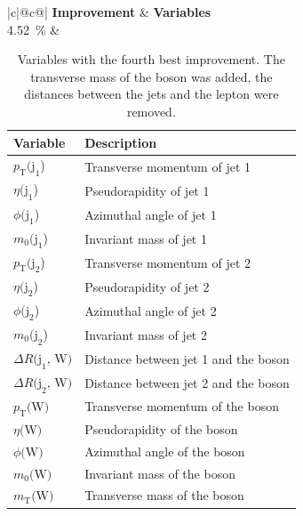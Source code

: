 \begin{table}[h]
    \centering
    \label{tab:app_vars_4}
    \caption{Variables with the fourth best improvement. The transverse mass of the \PW boson was added, the distances between the jets and the lepton were removed.}
    \begin{tabular}{ |c|@{}c@{}| }
        \hline
        \textbf{Improvement} & \textbf{Variables}\\
        \hline
        \SI{4.52}{\%} & 
        \begin{tabular}{ll}
            \hline
            Variable & Description\\
            \hline
            $p_\text{T}\text{(j}_\text{1}$) & Transverse momentum of jet 1\\
            $\eta\text{(j}_\text{1}$) & Pseudorapidity of jet 1\\
            $\phi\text{(j}_\text{1}$) & Azimuthal angle of jet 1\\
            $m_0\text{(j}_\text{1}$) & Invariant mass of jet 1\\

            $p_\text{T}\text{(j}_\text{2}$) & Transverse momentum of jet 2\\
            $\eta\text{(j}_\text{2}$) & Pseudorapidity of jet 2\\
            $\phi\text{(j}_\text{2}$) & Azimuthal angle of jet 2\\
            $m_0\text{(j}_\text{2}$) & Invariant mass of jet 2\\

            $\Delta R\text{(j}_\text{1}\text{, W)}$ & Distance between jet 1 and the \PW boson\\
            $\Delta R\text{(j}_\text{2}\text{, W)}$ & Distance between jet 2 and the \PW boson\\

            $p_\text{T}\text{(W)}$ & Transverse momentum of the \PW boson\\
            $\eta\text{(W)}$ & Pseudorapidity of the \PW boson\\
            $\phi\text{(W)}$ & Azimuthal angle of the \PW boson\\
            $m_0\text{(W)}$ & Invariant mass of the \PW boson\\
            $m_\text{T}\text{(W)}$ & Transverse mass of the \PW boson\\
            \hline
        \end{tabular}\\
        \hline
    \end{tabular}
\end{table}


